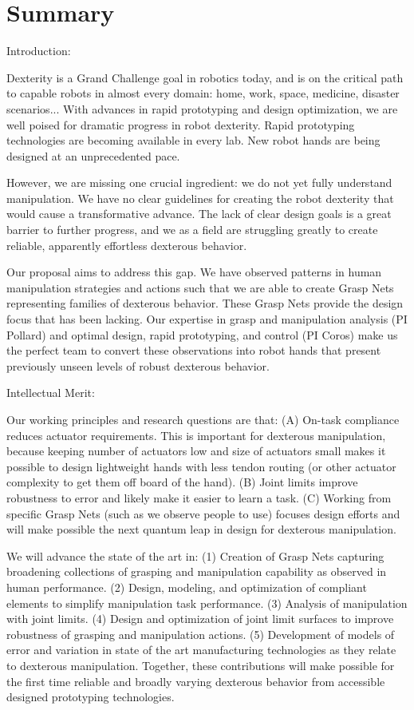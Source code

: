 \section{Summary}

Introduction:

Dexterity is a Grand Challenge goal in robotics today, and is on the critical path to capable robots in almost every domain:  home, work, space, medicine, disaster scenarios...    With advances in rapid prototyping and design optimization, we are well poised for dramatic progress in robot dexterity.   Rapid prototyping technologies are becoming available in every lab.    New robot hands are being designed at an unprecedented pace.

However, we are missing one crucial ingredient:  we do not yet fully understand manipulation.   We have no clear guidelines for creating the robot dexterity that would cause a transformative advance.   The lack of clear design goals is a great barrier to further progress, and we as a field are struggling greatly to create reliable, apparently effortless dexterous behavior.

Our proposal aims to address this gap.   We have observed patterns in human manipulation strategies and actions such that we are able to create Grasp Nets representing families of dexterous behavior.    These Grasp Nets provide the design focus that has been lacking.    Our expertise in grasp and manipulation analysis (PI Pollard) and optimal design, rapid prototyping, and control (PI Coros) make us the perfect team to convert these observations  into robot hands that present previously unseen levels of robust dexterous behavior.

Intellectual Merit:

Our working principles and research questions are that:
(A) On-task compliance reduces actuator requirements.   This is important for dexterous manipulation, because keeping number of actuators low and size of actuators small makes it possible to design lightweight hands with less tendon routing (or other actuator complexity to get them off board of the hand).
(B) Joint limits improve robustness to error and likely make it easier to learn a task.
(C) Working from specific Grasp Nets (such as we observe people to use) focuses design efforts and will make possible the next quantum leap in design for dexterous manipulation.

We will advance the state of the art in:
(1) Creation of Grasp Nets capturing broadening collections of grasping and manipulation capability as observed in human performance.
(2) Design, modeling, and optimization of compliant elements to simplify manipulation task performance.
(3) Analysis of manipulation with joint limits.
(4) Design and optimization of joint limit surfaces to improve robustness of grasping and manipulation actions.
(5) Development of models of error and variation in state of the art manufacturing technologies as they relate to dexterous manipulation.
Together, these contributions will make possible for the first time reliable and broadly varying dexterous behavior from accessible designed prototyping technologies.

